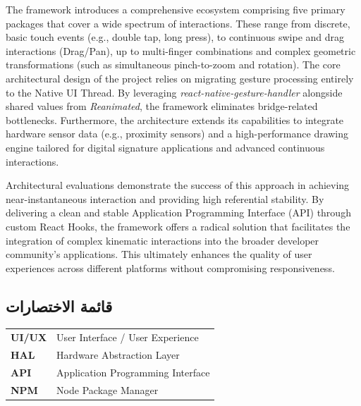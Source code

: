 \documentclass[12pt,a4paper]{report}
\begin{document}
The framework introduces a comprehensive ecosystem comprising five primary packages that cover a wide spectrum of interactions. These range from discrete, basic touch events (e.g., double tap, long press), to continuous swipe and drag interactions (Drag/Pan), up to multi-finger combinations and complex geometric transformations (such as simultaneous pinch-to-zoom and rotation). The core architectural design of the project relies on migrating gesture processing entirely to the Native UI Thread. By leveraging \textit{react-native-gesture-handler} alongside shared values from \textit{Reanimated}, the framework eliminates bridge-related bottlenecks. Furthermore, the architecture extends its capabilities to integrate hardware sensor data (e.g., proximity sensors) and a high-performance drawing engine tailored for digital signature applications and advanced continuous interactions.

Architectural evaluations demonstrate the success of this approach in achieving near-instantaneous interaction and providing high referential stability. By delivering a clean and stable Application Programming Interface (API) through custom React Hooks, the framework offers a radical solution that facilitates the integration of complex kinematic interactions into the broader developer community's applications. This ultimately enhances the quality of user experiences across different platforms without compromising responsiveness.
\par\endgroup

\listoftables
\listoffigures
\tableofcontents

\begin{Arabic}
\chapter*{قائمة الاختصارات}
\end{Arabic}

\begin{tabular}{@{}ll@{}}
\textbf{UI/UX} & User Interface / User Experience \\
\textbf{HAL}   & Hardware Abstraction Layer \\
\textbf{API}   & Application Programming Interface \\
\textbf{NPM}   & Node Package Manager \\
\end{tabular}
\end{document}
